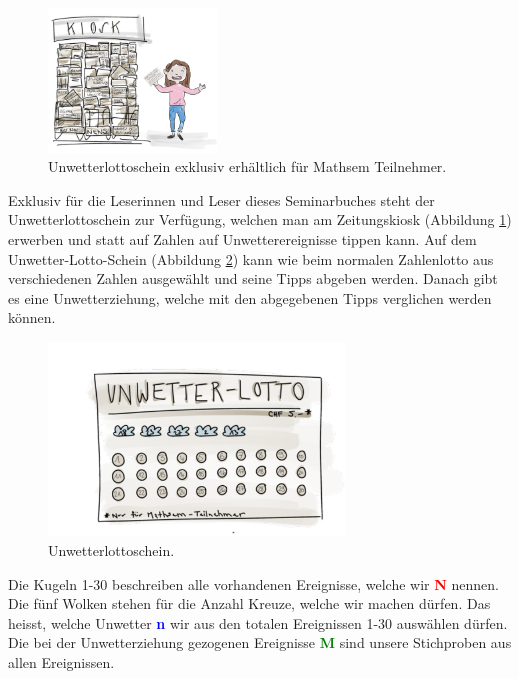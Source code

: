 \begin{refsection}
\begin{figure}
\centering
\includegraphics[width=0.4\textwidth]{extrem/Kiosk.pdf}
\caption{Unwetterlottoschein exklusiv erhältlich für Mathsem Teilnehmer.}
\label{Kiosk}
\end{figure}

Exklusiv für die Leserinnen und Leser dieses Seminarbuches steht der Unwetterlottoschein zur Verfügung, welchen man am Zeitungskiosk (Abbildung \ref{Kiosk}) erwerben und statt auf Zahlen auf Unwetterereignisse tippen kann. Auf dem Unwetter-Lotto-Schein (Abbildung \ref{Lottoschein}) kann wie beim normalen Zahlenlotto aus verschiedenen Zahlen ausgewählt und seine Tipps abgeben werden. Danach gibt es eine Unwetterziehung, welche mit den abgegebenen Tipps verglichen werden können.

\begin{figure}
\centering
\includegraphics[width=0.7\textwidth]{extrem/Lottoschein.pdf}
\caption{Unwetterlottoschein.}
\label{Lottoschein}
\end{figure}

Die Kugeln 1-30 beschreiben alle vorhandenen Ereignisse, welche wir \textcolor{red}{\textbf{N}} nennen. Die fünf Wolken stehen für die Anzahl Kreuze, welche wir machen dürfen. Das heisst, welche Unwetter \textcolor{blue}{\textbf{n}} wir aus den totalen Ereignissen 1-30 auswählen dürfen. Die bei der Unwetterziehung gezogenen Ereignisse \textcolor{green}{\textbf{M}} sind unsere Stichproben aus allen Ereignissen.


\end{refsection}
